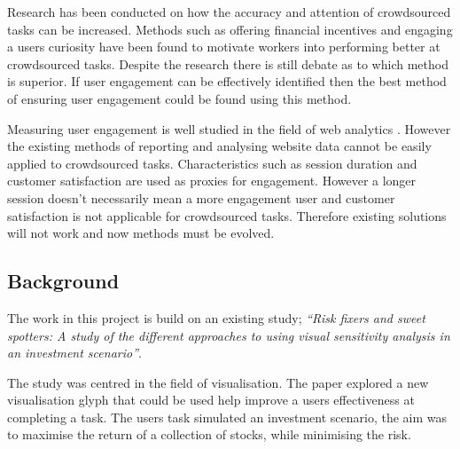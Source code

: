 \documentclass{article}
\begin{document}
Research has been conducted on how the accuracy and attention of crowdsourced tasks can be increased.
Methods such as offering financial incentives \cite{ho2015incentivizing} and engaging a users curiosity \cite{law2016curiosity} have been found to motivate workers into performing better at crowdsourced tasks.
Despite the research there is still debate as to which method is superior.
If user engagement can be effectively identified then the best method of ensuring user engagement could be found using this method.


Measuring user engagement is well studied in the field of web analytics \cite{peterson2008measuring}.
However the existing methods of reporting and analysing website data cannot be easily applied to crowdsourced tasks.    
Characteristics such as session duration and customer satisfaction are used as proxies for engagement.
However a longer session doesn't necessarily mean a more engagement user and customer satisfaction is not applicable for crowdsourced tasks.
Therefore existing solutions will not work and now methods must be evolved.


\subsection{Background}


The work in this project is build on an existing study;
\textit{``Risk fixers and sweet spotters: A study of the different approaches
to using visual sensitivity analysis in an investment scenario''}\cite{torsney2018risk}.

The study was centred in the field of visualisation.
The paper explored a new visualisation glyph that could be used help improve a users effectiveness at completing a task.
The users task simulated an investment scenario, the aim was to maximise the return of a collection of stocks, while minimising the risk. 
\end{document}
